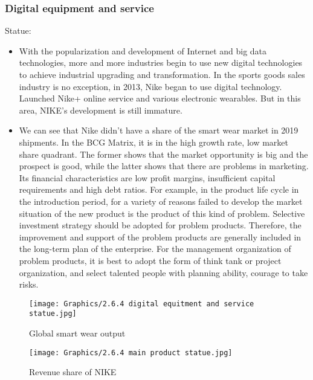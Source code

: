 \documentclass[a4paper, 12pt]{report}
\begin{document}
\subsubsection{Digital equipment and service}
\par
Statue:
\begin{itemize}
    \item With the popularization and development of Internet and big data technologies, more and more industries begin to use new digital technologies to achieve industrial upgrading and transformation. In the sports goods sales industry is no exception, in 2013, Nike began to use digital technology. Launched Nike+ online service and various electronic wearables. But in this area, NIKE’s development is still immature.
   
    \item We can see that Nike didn't have a share of the smart wear market in 2019 shipments. In the BCG Matrix, it is in the high growth rate, low market share quadrant. The former shows that the market opportunity is big and the prospect is good, while the latter shows that there are problems in marketing. Its financial characteristics are low profit margins, insufficient capital requirements and high debt ratios. For example, in the product life cycle in the introduction period, for a variety of reasons failed to develop the market situation of the new product is the product of this kind of problem. Selective investment strategy should be adopted for problem products. Therefore, the improvement and support of the problem products are generally included in the long-term plan of the enterprise. For the management organization of problem products, it is best to adopt the form of think tank or project organization, and select talented people with planning ability, courage to take risks.
\end{itemize}
\begin{figure}[htbp]
     \centering
     \begin{minipage}{.45\linewidth}
     \centering
     \texttt{[image: Graphics/2.6.4 digital equitment and service statue.jpg]}
     \caption{\label{2.6.4.1}Global smart wear output}
     \end{minipage}
     \qquad
     \begin{minipage}{.45\linewidth}
     \centering
     \texttt{[image: Graphics/2.6.4 main product statue.jpg]}
     \caption{\label{2.6.4.2}Revenue share of NIKE}
     \end{minipage}
\end{figure}
\end{document}
